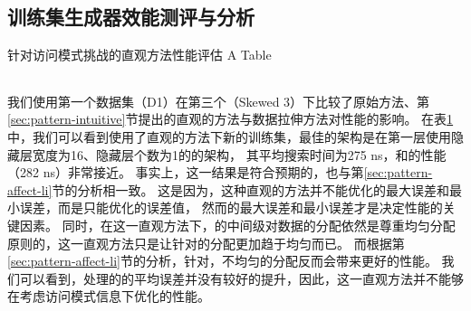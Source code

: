 \subsection{训练集生成器效能测评与分析}

\begin{table}[!hpb]
  \centering
  \bicaption[指向一个表格的表目录索引]
    {针对访问模式挑战的直观方法性能评估}
    {A Table}
  \label{tab:pattern-sol}
  \begin{tabular}{@{}llr@{}} \toprule
  \end{tabular}
\end{table}

我们使用第一个数据集（D1）在第三个{\skewwl}（Skewed 3）下比较了原始方法、第\ref{sec:pattern-intuitive}节提出的直观的方法与数据拉伸方法对{\li}性能的影响。
在表\ref{tab:pattern-sol}中，我们可以看到使用了直观的方法下新的训练集，最佳的{\rmi}架构是在第一层使用隐藏层宽度为16、隐藏层个数为1的{\nn}的{\rmi}架构，
其平均搜索时间为275 ns，和{\li}的性能（282 ns）非常接近。
事实上，这一结果是符合预期的，也与第\ref{sec:pattern-affect-li}节的分析相一致。
这是因为，这种直观的方法并不能优化{\model}的最大误差和最小误差，而是只能优化{\hotkey}的误差值，
然而{\model}的最大误差和最小误差才是决定{\li}性能的关键因素。
同时，在这一直观方法下，{\rmi}的中间级对数据的分配依然是尊重均匀分配原则的，这一直观方法只是让针对{\hotkey}的分配更加趋于均匀而已。
而根据第\ref{sec:pattern-affect-li}节的分析，针对{\hotkey}，不均匀的分配反而会带来更好的性能。
我们可以看到，处理{\hotkey}的{\model}的平均误差并没有较好的提升，因此，这一直观方法并不能够在考虑访问模式信息下优化{\li}的性能。


